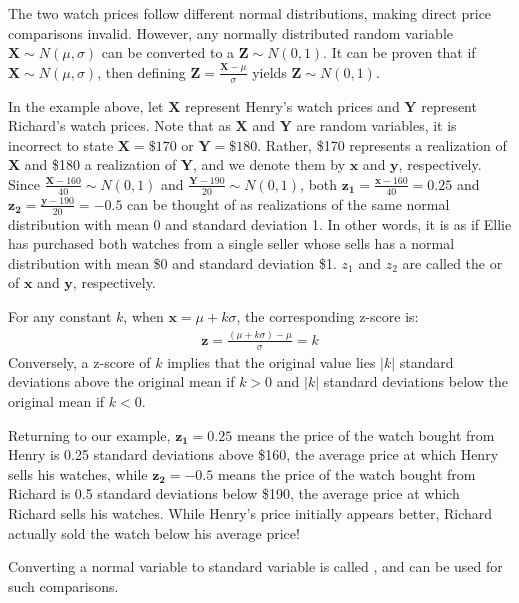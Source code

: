 The two watch prices follow different normal distributions, making direct price comparisons invalid.
However, any normally distributed random variable \( \bm{X} \sim N(\mu, \sigma) \) can be converted to a  \( \bm{Z} \sim N(0, 1) \).
It can be proven that if \( \bm{X} \sim N(\mu, \sigma) \), then defining \( \bm{Z} = \frac{\bm{X} - \mu}{\sigma} \) yields \( \bm{Z} \sim N(0, 1) \).

In the example above, let \( \bm{X} \) represent Henry's watch prices and \( \bm{Y} \) represent Richard's watch prices.
Note that as \( \bm{X} \) and \( \bm{Y} \) are random variables, it is incorrect to state \( \bm{X} = \$170 \) or \( \bm{Y} = \$180 \).
Rather, \$170 represents a realization of \( \bm{X} \) and \$180 a realization of \( \bm{Y} \), and we denote them by \( \bm{x} \) and \( \bm{y} \), respectively.
Since \( \frac{\bm{X} - 160}{40} \sim N(0, 1) \) and \( \frac{\bm{Y} - 190}{20} \sim N(0, 1) \), both \( \bm{z_1} = \frac{\bm{x} - 160}{40} = 0.25 \) and \( \bm{z_2} = \frac{\bm{y} - 190}{20} = -0.5 \) can be thought of as realizations of the same normal distribution with mean 0 and standard deviation 1.
In other words, it is as if Ellie has purchased both watches from a single seller whose sells has a normal distribution with mean \$0 and standard deviation \$1.
\( z_1 \) and \( z_2 \) are called the  or  of \( \bm{x} \) and \( \bm{y} \), respectively.

For any constant \( k \), when \( \bm{x} = \mu + k\sigma \), the corresponding z-score is:
\begin{gather*}
    \bm{z} = \frac{(\mu + k\sigma) - \mu}{\sigma} = k
\end{gather*}
Conversely, a z-score of \( k \) implies that the original value lies \( |k| \) standard deviations above the original mean if \( k > 0 \) and \( |k| \) standard deviations below the original mean if \( k < 0 \).

Returning to our example, \( \bm{z_1} = 0.25 \) means the price of the watch bought from Henry is 0.25 standard deviations above \$160, the average price at which Henry sells his watches,
while \( \bm{z_2} = -0.5 \) means the price of the watch bought from Richard is 0.5 standard deviations below \$190, the average price at which Richard sells his watches.
While Henry's price initially appears better, Richard actually sold the watch below his average price!

Converting a normal variable to standard variable is called , and can be used for such comparisons.

